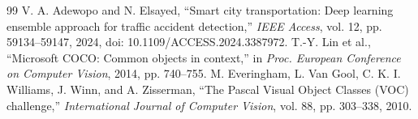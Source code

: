 \documentclass[12pt,a4paper]{article}
\begin{document}
\begin{thebibliography}{99}
 V. A. Adewopo and N. Elsayed, ``Smart city transportation: Deep learning ensemble approach for traffic accident detection,'' \emph{IEEE Access}, vol. 12, pp. 59134--59147, 2024, doi: 10.1109/ACCESS.2024.3387972.
 T.-Y. Lin et al., ``Microsoft COCO: Common objects in context,'' in \emph{Proc. European Conference on Computer Vision}, 2014, pp. 740--755.
 M. Everingham, L. Van Gool, C. K. I. Williams, J. Winn, and A. Zisserman, ``The Pascal Visual Object Classes (VOC) challenge,'' \emph{International Journal of Computer Vision}, vol. 88, pp. 303--338, 2010.
\end{thebibliography}
\end{document}
